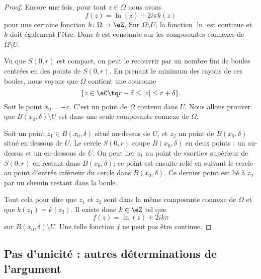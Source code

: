 \begin{proof}
	Encore une fois, pour tout \( z\in \Omega\) nous avons
	\begin{equation}
		f(z)=\ln(z)+2i\pi k(z)
	\end{equation}
	pour une certaine fonction \( k\colon \Omega\to \eZ\). Sur \( \Omega\setminus U\), la fonction \( \ln\) est continue et \( k\) doit également l'être. Donc \( k\) est constante sur les composantes connexes de \( \Omega\setminus U\).

	Vu que \( S(0,r)\) est compact, on peut le recouvrir par un nombre fini de boules centrées en des points de \( S(0,r)\). En prenant le minimum des rayons de ces boules, nous voyons que \( \Omega\) contient une couronne
	\begin{equation}
		\{ z\in \eC\tq r-\delta\leq | z |\leq r+\delta \}.
	\end{equation}
	Soit le point \( x_0=-r\). C'est un point de \( \Omega\) contenu dans \( U\). Nous allons prouver que \( B(x_0,\delta)\setminus U\) est dans une seule composante connexe de \( \Omega\).

	Soit un point \( z_1\in B(x_0,\delta)\) situé au-dessus de \( U\), et \( z_2\) un point de \( B(x_0,\delta)\) situé en dessous de \( U\). Le cercle \( S(0,r)\) coupe \( B(x_0,\delta)\) en deux points : un au-dessus et un en-dessous de \( U\). On peut lier \( z_1\) au point de «sortie» supérieur de \( S(0,r)\) en restant dans \( B(x_0,\delta)\); ce point est ensuite relié en suivant le cercle au point d'entrée inférieur du cercle dans \( B(x_0,\delta)\). Ce dernier point est lié à \( z_2\) par un chemin restant dans la boule.

	Tout cela pour dire que \( z_1\) et \( z_2\) sont dans la même composante connexe de \( \Omega\) et que \( k(z_1)=k(z_2)\). Il existe donc \( k\in \eZ\) tel que
	\begin{equation}
		f(z)=\ln(z)+2ik\pi
	\end{equation}
	sur \( B(x_0,\delta)\setminus U\). Une telle fonction \( f\) ne peut pas être continue.
\end{proof}

\subsection{Pas d'unicité : autres déterminations de l'argument}

